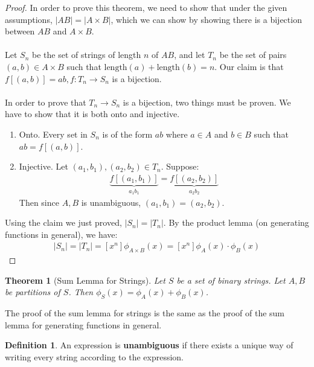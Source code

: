 \documentclass[]{article}
\newtheorem*{theorem}{Theorem}
\theoremstyle{definition}
\newtheorem*{defn}{Definition}
\begin{document}
			\begin{proof}
				In order to prove this theorem, we need to show that under the given assumptions, $|AB| = |A \times B|$, which we can show by showing there is a bijection between $AB$ and $A \times B$.
				\\ \\
				Let $S_n$ be the set of strings of length $n$ of $AB$, and let $T_n$ be the set of pairs $(a, b) \in A \times B$ such that $\text{length}(a) + \text{length}(b) = n$. Our claim is that $f[(a, b)] = ab, f : T_n \to S_n$ is a bijection.
				\\ \\
				In order to prove that $T_n \to S_n$ is a bijection, two things must be proven. We have to show that it is both onto and injective.
				\begin{enumerate}
					\item Onto. Every set in $S_n$ is of the form $ab$ where $a \in A$ and $b \in B$ such that $ab = f[(a, b)]$.
					\item Injective. Let $(a_1, b_1), (a_2, b_2) \in T_n$. Suppose:
						\begin{align*}
							\underbrace{f[(a_1, b_1)]}_{a_1b_1} = \underbrace{f[(a_2, b_2)]}_{a_2b_2}
						\end{align*}
						Then since $A,B$ is unambiguous, $(a_1, b_1) = (a_2, b_2)$.
				\end{enumerate}

				Using the claim we just proved, $|S_n| = |T_n|$. By the product lemma (on generating functions in general), we have:
				\begin{align*}
					|S_n| = |T_n| = [x^n] \phi_{A \times B}(x) = [x^n] \phi_A(x) \cdot \phi_B(x)
				\end{align*}
			\end{proof}

			\begin{theorem}[Sum Lemma for Strings]
				Let $S$ be a set of binary strings. Let $A, B$ be partitions of $S$. Then $\phi_S(x) = \phi_A(x) + \phi_B(x)$.
			\end{theorem}

			The proof of the sum lemma for strings is the same as the proof of the sum lemma for generating functions in general.

			\begin{defn}
				An expression is \textbf{unambiguous} if there exists a unique way of writing every string according to the expression.
			\end{defn}
\end{document}
